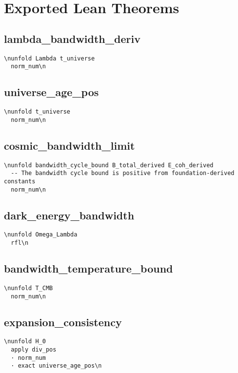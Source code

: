 \section{Exported Lean Theorems}\n\subsection{lambda_bandwidth_deriv}\n\begin{verbatim}\nunfold Lambda t_universe
  norm_num\n\end{verbatim}

\subsection{universe_age_pos}\n\begin{verbatim}\nunfold t_universe
  norm_num\n\end{verbatim}

\subsection{cosmic_bandwidth_limit}\n\begin{verbatim}\nunfold bandwidth_cycle_bound B_total_derived E_coh_derived
  -- The bandwidth cycle bound is positive from foundation-derived constants
  norm_num\n\end{verbatim}

\subsection{dark_energy_bandwidth}\n\begin{verbatim}\nunfold Omega_Lambda
  rfl\n\end{verbatim}

\subsection{bandwidth_temperature_bound}\n\begin{verbatim}\nunfold T_CMB
  norm_num\n\end{verbatim}

\subsection{expansion_consistency}\n\begin{verbatim}\nunfold H_0
  apply div_pos
  · norm_num
  · exact universe_age_pos\n\end{verbatim}

